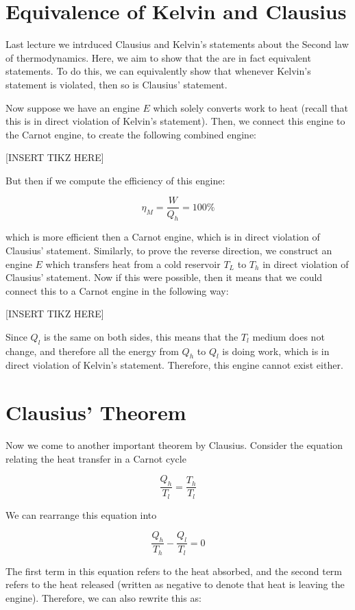     \section{Equivalence of Kelvin and Clausius} 

    Last lecture we intrduced Clausius and Kelvin's statements about the Second law of thermodynamics. Here, we aim to show that the are in fact equivalent statements. To do this, we can equivalently show that whenever Kelvin's statement is violated, then so is Clausius' statement. 

    Now suppose we have an engine $E$ which solely converts work to heat (recall that this is in direct violation of Kelvin's statement). Then, we connect this engine to the Carnot engine, to create the following combined engine: 

    [INSERT TIKZ HERE] 

    But then if we compute the efficiency of this engine: 

    \[ \eta_M = \frac{W}{Q_h} = 100\%\]

    which is more efficient then a Carnot engine, which is in direct violation of Clausius' statement. Similarly, to prove the reverse direction, we construct an engine $E$ which transfers heat from a cold reservoir $T_L$ to $T_h$ in direct violation of Clausius' statement. Now if this were possible, then it means that we could connect this to a Carnot engine in the following way:

    [INSERT TIKZ HERE] 

    Since $Q_l$ is the same on both sides, this means that the $T_l$ medium does not change, and therefore all the energy from $Q_h$ to $Q_l$ is doing work, which is in direct violation of Kelvin's statement. Therefore, this engine cannot exist either.


    \section{Clausius' Theorem} 

    Now we come to another important theorem by Clausius. Consider the equation relating the heat transfer in a Carnot cycle

    \[ \frac{Q_h}{T_l} = \frac{T_h}{T_l}\] 

    We can rearrange this equation into

    \[ \frac{Q_h}{T_h} - \frac{Q_l}{T_l} = 0\] 

    The first term in this equation refers to the heat absorbed, and the second term refers to the heat released (written as negative to denote that heat is leaving the engine). Therefore, we can also rewrite this as: 

